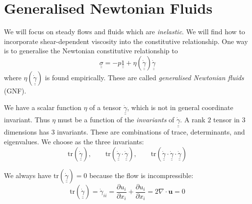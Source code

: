 \documentclass{jknotes}
\newcommand{\dunder}[1]{\underline{\underline{#1}}}
\renewcommand{\trace}[1]{\text{tr}\left(#1\right)}
\newcommand{\srate}{\dot{\gamma}}
\begin{document}
\begin{center}
\end{center}

\section{Generalised Newtonian Fluids}

We will focus on steady flows and fluids which are \emph{inelastic}. We will
find how to incorporate shear-dependent viscosity into the constitutive
relationship. One way is to generalise the Newtonian constitutive
relationship to
\begin{equation}
	\dunder{\sigma} = -p \dunder{1} +
	\eta(\dunder{\dot{\gamma}})\dunder{\dot{\gamma}}
\end{equation}
where $\eta(\dunder{\dot{\gamma}})$ is found empirically. These are called
\emph{generalised Newtonian fluids} (GNF).

We have a scalar function $\eta$ of a tensor $\dunder{\dot{\gamma}}$, which is
not in general coordinate invariant. Thus $\eta$ must be a function of the
\emph{invariants} of $\dunder{\dot{\gamma}}$. A rank $2$ tensor in $3$
dimensions has $3$ invariants. These are combinations of trace, determinants,
and eigenvalues. We choose as the three invariants:
\begin{equation}
	\trace{\dunder{\srate}}, \hspace{2em} \trace{\dunder{\srate} \cdot
	\dunder{\srate}}, \hspace{2em} \trace{\dunder{\srate} \cdot
\dunder{\srate} \cdot \dunder{\srate}}
\end{equation}

We always have $\trace{\dunder{\srate}} = 0$ because the flow is incompressible:
\begin{equation}
	\trace{\dunder{\srate}} = \dot{\gamma}_{ii} = \frac{\partial u_i}{\partial x_i} +
	\frac{\partial u_i}{\partial x_i} = 2\nabla \cdot \bm{u} = 0
\end{equation}
\end{document}
